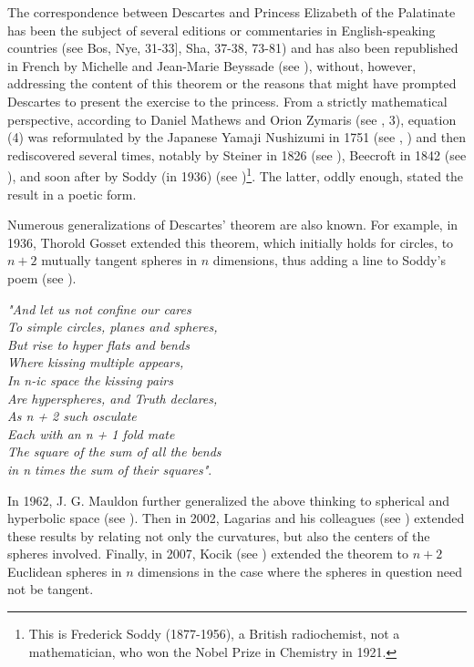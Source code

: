 \documentclass[12pt]{article}
\theoremstyle{définition}
\theoremstyle{remark}
\theoremstyle{plain}
\theoremstyle{plain}
\begin{document}
The correspondence between Descartes and Princess Elizabeth of the Palatinate has been the subject of several editions or commentaries in English-speaking countries (see Bos, Nye, 31-33], Sha, 37-38, 73-81) and has also been republished in French by Michelle and Jean-Marie Beyssade (see \cite{Bey}), without, however, addressing the content of this theorem or the reasons that might have prompted Descartes to present the exercise to the princess. From a strictly mathematical perspective, according to Daniel Mathews and Orion Zymaris (see \cite{Mat}, 3), equation (4) was reformulated by the Japanese Yamaji Nushizumi in 1751 (see \cite{Mic1}, \cite{Mic2}) and then rediscovered several times, notably by Steiner in 1826 (see \cite{Ste}), Beecroft in 1842 (see \cite{Bee}), and soon after by Soddy (in 1936) (see \cite{Sod2})\footnote{This is Frederick Soddy (1877-1956), a British radiochemist, not a mathematician, who won the Nobel Prize in Chemistry in 1921.}. The latter, oddly enough, stated the result in a poetic form.

Numerous generalizations of Descartes' theorem are also known. For example, in 1936, Thorold Gosset extended this theorem, which initially holds for circles, to $n + 2$ mutually tangent spheres in $n$ dimensions, thus adding a line to Soddy's poem (see \cite{Gos}).

{\it "And let us not confine our cares\\
To simple circles, planes and spheres,\\
But rise to hyper flats and bends\\
Where kissing multiple appears,\\
In n-ic space the kissing pairs\\
Are hyperspheres, and Truth declares,\\
As n + 2 such osculate\\
Each with an n + 1 fold mate\\
The square of the sum of all the bends\\
in n  times the sum of their squares"}.


In 1962, J. G. Mauldon further generalized the above thinking to spherical and hyperbolic space (see \cite{Mau}). Then in 2002, Lagarias and his colleagues (see \cite{Lag}) extended these results by relating not only the curvatures, but also the centers of the spheres involved. Finally, in 2007, Kocik (see \cite{Koc1}) extended the theorem to $n + 2$ Euclidean spheres in $n$ dimensions in the case where the spheres in question need not be tangent.
\end{document}
